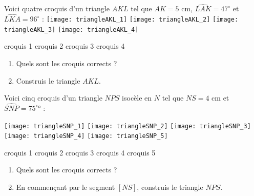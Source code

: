\begin{activite}

Voici quatre croquis d'un triangle $AKL$ tel que $AK = 5$ cm, $\widehat{LAK} = 47^\circ$ et $\widehat{LKA} = 96^\circ$ :
\texttt{[image: triangleAKL\_1]} \hfill \texttt{[image: triangleAKL\_2]} \hfill \texttt{[image: triangleAKL\_3]} \hfill \texttt{[image: triangleAKL\_4]}

\qquad croquis 1 \hfill croquis 2 \hfill croquis 3 \hfill croquis 4 \hfill \\[0.2em]

\begin{enumerate}

\item Quels sont les croquis corrects ?  \dotfill

\item Construis le triangle $AKL$.
\end{enumerate}

\end{activite}



\begin{activite}

Voici cinq croquis d'un triangle $NPS$ isocèle en $N$ tel que $NS = 4$ cm et $\widehat{SNP} = 75^\circ°$ :

\texttt{[image: triangleSNP\_1]} \hfill \texttt{[image: triangleSNP\_2]} \hfill \texttt{[image: triangleSNP\_3]} \hfill \texttt{[image: triangleSNP\_4]} \hfill \texttt{[image: triangleSNP\_5]} 

\quad croquis 1 \hfill croquis 2 \hfill croquis 3 \hfill croquis 4 \hfill croquis 5 \\[0.2em]

\begin{enumerate}

\item Quels sont les croquis corrects ? \dotfill

\item En commençant par le segment $[NS]$, construis le triangle $NPS$.
\end{enumerate}

\end{activite}
